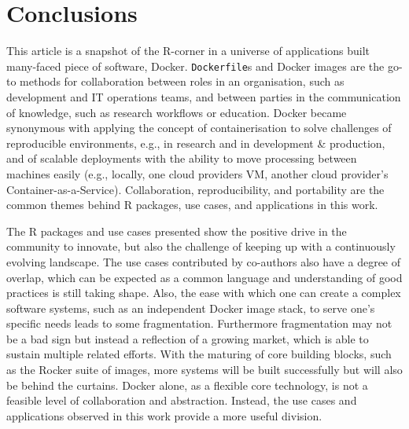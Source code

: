 \hypertarget{conclusions}{%
\section{Conclusions}\label{conclusions}}

This article is a snapshot of the R-corner in a universe of applications
built many-faced piece of software, Docker. \texttt{Dockerfile}s and
Docker images are the go-to methods for collaboration between roles in
an organisation, such as development and IT operations teams, and
between parties in the communication of knowledge, such as research
workflows or education. Docker became synonymous with applying the
concept of containerisation to solve challenges of reproducible
environments, e.g., in research and in development \& production, and of
scalable deployments with the ability to move processing between
machines easily (e.g., locally, one cloud providers VM, another cloud
provider's Container-as-a-Service). Collaboration, reproducibility, and
portability are the common themes behind R packages, use cases, and
applications in this work.

The R packages and use cases presented show the positive drive in the
community to innovate, but also the challenge of keeping up with a
continuously evolving landscape. The use cases contributed by co-authors
also have a degree of overlap, which can be expected as a common
language and understanding of good practices is still taking shape.
Also, the ease with which one can create a complex software systems,
such as an independent Docker image stack, to serve one's specific needs
leads to some fragmentation. Furthermore fragmentation may not be a bad
sign but instead a reflection of a growing market, which is able to
sustain multiple related efforts. With the maturing of core building
blocks, such as the Rocker suite of images, more systems will be built
successfully but will also be behind the curtains. Docker alone, as a
flexible core technology, is not a feasible level of collaboration and
abstraction. Instead, the use cases and applications observed in this
work provide a more useful division.

